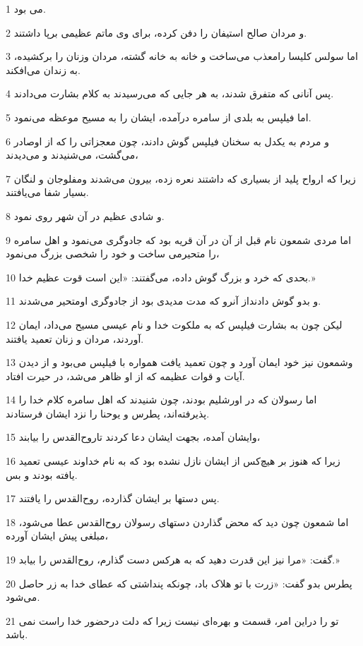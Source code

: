 \par 1 می بود.
\par 2 و مردان صالح استیفان را دفن کرده، برای وی ماتم عظیمی برپا داشتند.
\par 3 اما سولس کلیسا رامعذب می‌ساخت و خانه به خانه گشته، مردان وزنان را برکشیده، به زندان می‌افکند.
\par 4 پس آنانی که متفرق شدند، به هر جایی که می‌رسیدند به کلام بشارت می‌دادند.
\par 5 اما فیلپس به بلدی از سامره درآمده، ایشان را به مسیح موعظه می‌نمود.
\par 6 و مردم به یکدل به سخنان فیلپس گوش دادند، چون معجزاتی را که از اوصادر می‌گشت، می‌شنیدند و می‌دیدند،
\par 7 زیرا که ارواح پلید از بسیاری که داشتند نعره زده، بیرون می‌شدند ومفلوجان و لنگان بسیار شفا می‌یافتند.
\par 8 و شادی عظیم در آن شهر روی نمود.
\par 9 اما مردی شمعون نام قبل از آن در آن قریه بود که جادوگری می‌نمود و اهل سامره را متحیرمی ساخت و خود را شخصی بزرگ می‌نمود،
\par 10 بحدی که خرد و بزرگ گوش داده، می‌گفتند: «این است قوت عظیم خدا.»
\par 11 و بدو گوش دادنداز آنرو که مدت مدیدی بود از جادوگری اومتحیر می‌شدند.
\par 12 لیکن چون به بشارت فیلپس که به ملکوت خدا و نام عیسی مسیح می‌داد، ایمان آوردند، مردان و زنان تعمید یافتند.
\par 13 وشمعون نیز خود ایمان آورد و چون تعمید یافت همواره با فیلپس می‌بود و از دیدن آیات و قوات عظیمه که از او ظاهر می‌شد، در حیرت افتاد.
\par 14 اما رسولان که در اورشلیم بودند، چون شنیدند که اهل سامره کلام خدا را پذیرفته‌اند، پطرس و یوحنا را نزد ایشان فرستادند.
\par 15 وایشان آمده، بجهت ایشان دعا کردند تاروح‌القدس را بیابند،
\par 16 زیرا که هنوز بر هیچ‌کس از ایشان نازل نشده بود که به نام خداوند عیسی تعمید یافته بودند و بس.
\par 17 پس دستها بر ایشان گذارده، روح‌القدس را یافتند.
\par 18 اما شمعون چون دید که محض گذاردن دستهای رسولان روح‌القدس عطا می‌شود، مبلغی پیش ایشان آورده،
\par 19 گفت: «مرا نیز این قدرت دهید که به هرکس دست گذارم، روح‌القدس را بیابد.»
\par 20 پطرس بدو گفت: «زرت با تو هلاک باد، چونکه پنداشتی که عطای خدا به زر حاصل می‌شود.
\par 21 تو را دراین امر، قسمت و بهره‌ای نیست زیرا که دلت درحضور خدا راست نمی باشد.
